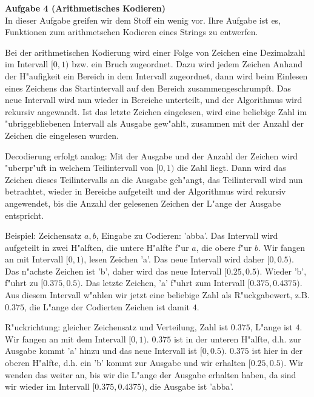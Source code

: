 \documentclass[a4paper]{article}
\begin{document}
\bigskip

{\bf Aufgabe 4  \quad(Arithmetisches Kodieren)}\\
In dieser Aufgabe greifen wir dem Stoff ein wenig vor. Ihre Aufgabe ist es,
Funktionen zum arithmetschen Kodieren eines Strings zu entwerfen.

\bigskip

Bei der arithmetischen Kodierung wird einer Folge von Zeichen eine Dezimalzahl
im Intervall $[0,1)$ bzw. ein Bruch zugeordnet. Dazu wird jedem Zeichen Anhand
der H"aufigkeit ein Bereich in dem Intervall zugeordnet, dann wird beim Einlesen
eines Zeichens das Startintervall auf den Bereich zusammengeschrumpft. Das
neue Intervall wird nun wieder in Bereiche unterteilt, und der Algorithmus wird
rekursiv angewandt. Ist das letzte Zeichen eingelesen, wird eine beliebige
Zahl im "ubriggebliebenen Intervall als Ausgabe gew"ahlt, zusammen mit der
Anzahl der Zeichen die eingelesen wurden.

Decodierung erfolgt analog: Mit der Ausgabe und der Anzahl der Zeichen wird
"uberpr"uft in welchem Teilintervall von $[0,1)$ die Zahl liegt. Dann wird
das Zeichen dieses Teilintervalls an die Ausgabe geh"angt, das Teilintervall
wird nun betrachtet, wieder in Bereiche aufgeteilt und der Algorithmus wird
rekursiv angewendet, bis die Anzahl der gelesenen Zeichen der L"ange der
Ausgabe entspricht.

\bigskip

Beispiel: Zeichensatz ${a, b}$, Eingabe zu Codieren: 'abba'. Das Intervall
wird aufgeteilt in zwei H"alften, die untere H"alfte f"ur $a$, die obere
f"ur $b$. Wir fangen an mit Intervall $[0,1)$, lesen Zeichen 'a'. Das neue
Intervall wird daher $[0,0.5)$. Das n"achste Zeichen ist 'b', daher wird
das neue Intervall $[0.25,0.5)$. Wieder 'b', f"uhrt zu $[0.375,0.5)$.
Das letzte Zeichen, 'a' f"uhrt zum Intervall $[0.375,0.4375)$. Aus diesem
Intervall w"ahlen wir jetzt eine beliebige Zahl als R"uckgabewert, z.B.
$0.375$, die L"ange der Codierten Zeichen ist damit $4$.

R"uckrichtung: gleicher Zeichensatz und Verteilung, Zahl ist $0.375$, L"ange
ist $4$. Wir fangen an mit dem Intervall $[0,1)$. $0.375$ ist in der
unteren H"alfte, d.h. zur Ausgabe kommt 'a' hinzu und das neue Intervall ist
$[0,0.5)$. $0.375$ ist hier in der oberen H"alfte, d.h. ein 'b' kommt zur
Ausgabe und wir erhalten $[0.25,0.5)$. Wir wenden das weiter an, bis wir
die L"ange der Ausgabe erhalten haben, da sind wir wieder im Intervall
$[0.375,0.4375)$, die Ausgabe ist 'abba'.
\end{document}
